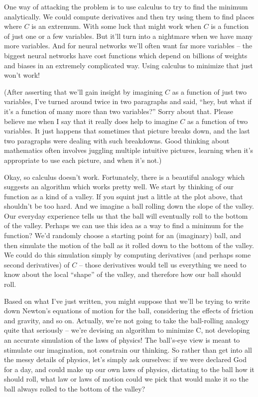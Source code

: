 \documentclass[a4paper,twoside,10pt]{book}
\begin{document}
One way of attacking the problem is to use calculus to try to find the minimum analytically. We could compute derivatives and then try using them to find places where $C$ is an extremum. With some luck that might work when $C$ is a function of just one or a few variables. But it'll turn into a nightmare when we have many more variables. And for neural networks we'll often want far more variables -- the biggest neural networks have cost functions which depend on billions of weights and biases in an extremely complicated way. Using calculus to minimize that just won't work!

(After asserting that we'll gain insight by imagining $C$ as a function of just two variables, I've turned around twice in two paragraphs and said, ``hey, but what if it's a function of many more than two variables?'' Sorry about that. Please believe me when I say that it really does help to imagine $C$ as a function of two variables. It just happens that sometimes that picture breaks down, and the last two paragraphs were dealing with such breakdowns. Good thinking about mathematics often involves juggling multiple intuitive pictures, learning when it's appropriate to use each picture, and when it's not.)


Okay, so calculus doesn't work. Fortunately, there is a beautiful analogy which suggests an algorithm which works pretty well. We start by thinking of our function as a kind of a valley. If you squint just a little at the plot above, that shouldn't be too hard. And we imagine a ball rolling down the slope of the valley. Our everyday experience tells us that the ball will eventually roll to the bottom of the valley. Perhaps we can use this idea as a way to find a minimum for the function? We'd randomly choose a starting point for an (imaginary) ball, and then simulate the motion of the ball as it rolled down to the bottom of the valley. We could do this simulation simply by computing derivatives (and perhaps some second derivatives) of $C$ -- those derivatives would tell us everything we need to know about the local ``shape'' of the valley, and therefore how our ball should roll.

Based on what I've just written, you might suppose that we'll be trying to write down Newton's equations of motion for the ball, considering the effects of friction and gravity, and so on. Actually, we're not going to take the ball-rolling analogy quite that seriously -- we're devising an algorithm to minimize C, not developing an accurate simulation of the laws of physics! The ball's-eye view is meant to stimulate our imagination, not constrain our thinking. So rather than get into all the messy details of physics, let's simply ask ourselves: if we were declared God for a day, and could make up our own laws of physics, dictating to the ball how it should roll, what law or laws of motion could we pick that would make it so the ball always rolled to the bottom of the valley?
\end{document}
